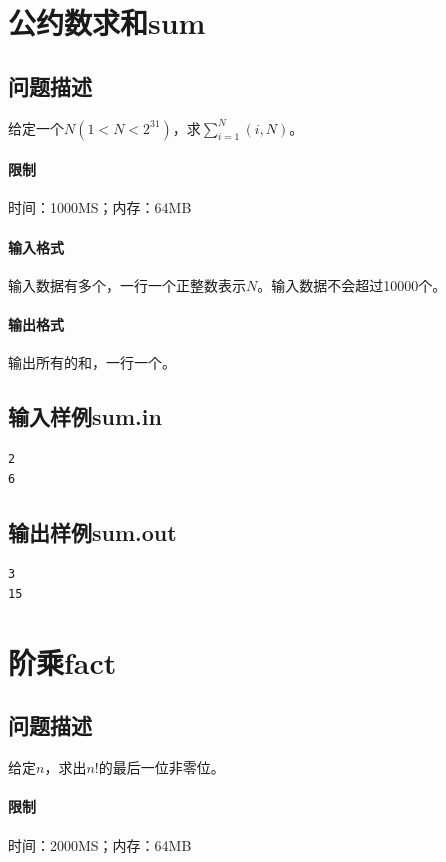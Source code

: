 \documentclass{ctexrep}
\begin{document}
\newpage
\section*{公约数求和sum}

\subsection*{问题描述}
给定一个$N(1<N<2^{31})$，求$\displaystyle\sum_{i=1}^N (i,N)$。

\paragraph{限制} 时间：1000MS；内存：64MB

\paragraph{输入格式}
输入数据有多个，一行一个正整数表示$N$。输入数据不会超过10000个。

\paragraph{输出格式}
输出所有的和，一行一个。

\subsection*{输入样例sum.in}
\begin{verbatim}
2
6
\end{verbatim}

\subsection*{输出样例sum.out}
\begin{verbatim}
3
15
\end{verbatim}

\newpage
\section*{阶乘fact}

\subsection*{问题描述}
给定$n$，求出$n!$的最后一位非零位。

\paragraph{限制} 时间：2000MS；内存：64MB
\end{document}
